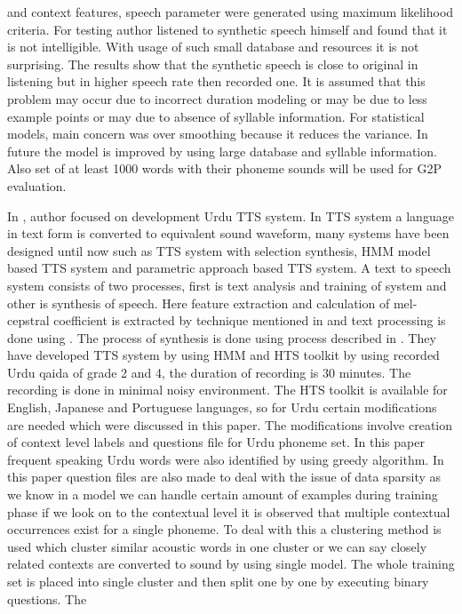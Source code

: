 and context features, speech parameter were generated using maximum likelihood criteria. For testing author listened to
synthetic speech himself and found that it is not intelligible. With usage of such small database and resources it is not
surprising. The results show that the synthetic speech is close to original in listening but in higher speech rate then recorded
one. It is assumed that this problem may occur due to incorrect duration modeling or may be due to less example points or
may due to absence of syllable information. For statistical models, main concern was over smoothing because it reduces the
variance. In future the model is improved by using large database and syllable information. Also set of at least 1000 words
with their phoneme sounds will be used for G2P evaluation.

In \cite{nawaz2014hidden}, author focused on development Urdu TTS system. In TTS system a language in text form is
converted to equivalent sound waveform, many systems have been designed until now such as TTS system with selection
synthesis, HMM model based TTS system and parametric approach based TTS system. A text to speech system consists of
two processes, first is text analysis and training of system and other is synthesis of speech. Here feature extraction and
calculation of mel-cepstral coefficient is extracted by technique mentioned in \cite{fukada1992adaptive} and text processing is done using \cite{kabir2002natural}. The process of synthesis is done using process described in \cite{tokuda2000speech}. They have developed TTS system by
using HMM and HTS toolkit by using recorded Urdu qaida of grade 2 and 4, the duration of recording is 30 minutes. The
recording is done in minimal noisy environment. The HTS toolkit is available for English, Japanese and Portuguese
languages, so for Urdu certain modifications are needed which were discussed in this paper. The modifications involve
creation of context level labels and questions file for Urdu phoneme set. In this paper frequent speaking Urdu words were
also identified by using greedy algorithm. In this paper question files are also made to deal with the issue of data sparsity as
we know in a model we can handle certain amount of examples during training phase if we look on to the contextual level it
is observed that multiple contextual occurrences exist for a single phoneme. To deal with this a clustering method is used
which cluster similar acoustic words in one cluster or we can say closely related contexts are converted to sound by using
single model. The whole training set is placed into single cluster and then split one by one by executing binary questions. The
